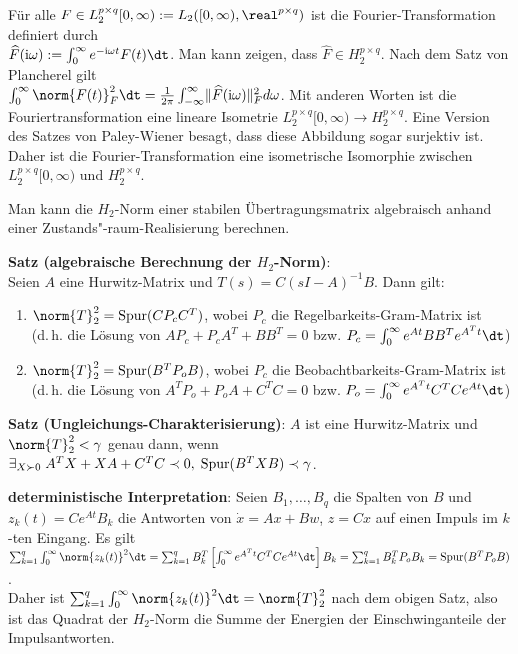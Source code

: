Für alle $F \in L_2^{p \times q}[0, \infty) := L_2([0, \infty), \real^{p \times q})$ ist die
Fourier-Transformation definiert durch\\
$\widehat{F}(\iu\omega) := \int_0^\infty e^{-\iu\omega t} F(t)\dt$.
Man kann zeigen, dass $\widehat{F} \in H_2^{p \times q}$.
Nach dem Satz von Plancherel gilt\\
$\int_0^\infty \norm{F(t)}_F^2 \dt =
\frac{1}{2\pi} \int_{-\infty}^\infty \lVert\widehat{F}(\iu\omega)\rVert_F^2 d\omega$.
Mit anderen Worten ist die Fouriertransformation eine lineare Isometrie
$L_2^{p \times q}[0, \infty) \rightarrow H_2^{p \times q}$.
Eine Version des Satzes von Paley-Wiener besagt, dass diese Abbildung sogar surjektiv ist.
Daher ist die Fourier-Transformation eine isometrische Isomorphie zwischen
$L_2^{p \times q}[0, \infty)$ und $H_2^{p \times q}$.

\linie

Man kann die $H_2$-Norm einer stabilen Übertragungsmatrix algebraisch anhand einer
Zustands"-raum-Realisierung berechnen.

\textbf{Satz (algebraische Berechnung der $H_2$-Norm)}:\\
Seien $A$ eine Hurwitz-Matrix und $T(s) = C(sI - A)^{-1}B$.
Dann gilt:
\begin{enumerate}
    \item
    $\norm{T}_2^2 = \Spur(C P_c C^T)$, wobei
    $P_c$ die Regelbarkeits-Gram-Matrix ist\\
    (d.\,h. die Lösung von $AP_c + P_c A^T + BB^T = 0$
    bzw. $P_c = \int_0^\infty e^{At} B B^T e^{A^T t} \dt$)
    
    \item
    $\norm{T}_2^2 = \Spur(B^T P_o B)$, wobei
    $P_c$ die Beobachtbarkeits-Gram-Matrix ist\\
    (d.\,h. die Lösung von $A^T P_o + P_o A + C^T C = 0$
    bzw. $P_o = \int_0^\infty e^{A^T t} C^T C e^{At} \dt$)
\end{enumerate}

\textbf{Satz (Ungleichungs-Charakterisierung)}:
$A$ ist eine Hurwitz-Matrix und $\norm{T}_2^2 < \gamma$ genau dann, wenn
$\exists_{X \succ 0}\; A^T X + XA + C^T C \prec 0,\; \operatorname{Spur}(B^T X B) \prec \gamma$.

\linie

\textbf{deterministische Interpretation}:
Seien $B_1, \dotsc, B_q$ die Spalten von $B$ und $z_k(t) = Ce^{At} B_k$ die Antworten
von $\dot{x} = Ax + Bw$, $z = Cx$ auf einen Impuls im $k$-ten Eingang.
Es gilt
$\sum_{k=1}^q \int_0^\infty \norm{z_k(t)}^2 \dt
= \sum_{k=1}^q B_k^T \left[\int_0^\infty e^{A^T t} C^T C e^{At} \dt\right] B_k
= \sum_{k=1}^q B_k^T P_o B_k
= \Spur(B^T P_o B)$.\\
Daher ist $\sum_{k=1}^q \int_0^\infty \norm{z_k(t)}^2 \dt = \norm{T}_2^2$ nach dem obigen Satz,
also ist das Quadrat der
$H_2$-Norm die Summe der Energien der Einschwinganteile der Impulsantworten.

